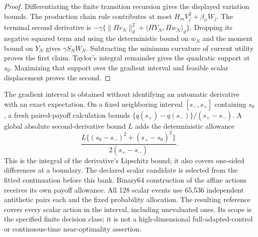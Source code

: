 \begin{proof}
Differentiating the finite transition recursion gives the displayed
variation bounds. The production chain rule contributes at most
$H_mV_j^2+\beta_\psi W_j$. The terminal second derivative is
$-\gamma\{\|\Pi v_N\|_d^2+\langle\Pi Y_N,\Pi w_N\rangle_d\}$.
Dropping its negative squared term and using the deterministic bound
on $w_N$ and the moment bound on $Y_N$ gives $\gamma S_NW_N$.
Subtracting the minimum curvature of current utility proves the
first claim. Taylor's integral remainder gives the quadratic support
at $s_0$. Maximizing that support over the gradient interval and
feasible scalar displacement proves the second.
\end{proof}

The gradient interval is obtained without identifying an automatic
derivative with an exact expectation. On a fixed neighboring interval
$[s_-,s_+]$ containing $s_0$, a fresh paired-payoff calculation bounds
$\{q(s_+)-q(s_-)\}/(s_+-s_-)$. A global absolute second-derivative
bound $L$ adds the deterministic allowance
\[
 \frac{L\{(s_0-s_-)^2+(s_+-s_0)^2\}}{2(s_+-s_-)}.
\]
This is the integral of the derivative's Lipschitz bound; it also
covers one-sided differences at a boundary. The declared scalar
candidate is selected from the fitted continuation before this bank.
Binary64 construction of the affine actions receives its own payoff
allowance. All 128 scalar events use 65,536 independent antithetic
pairs each and the fixed probability allocation. The resulting
reference covers every scalar action in the interval, including
unevaluated ones. Its scope is the specified finite decision class;
it is not a high-dimensional full-adapted-control or continuous-time
near-optimality assertion.
